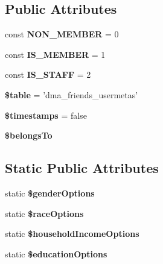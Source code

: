 \subsection*{Public Attributes}
\begin{DoxyCompactItemize}
\item 
\hypertarget{classDMA_1_1Friends_1_1Models_1_1Usermeta_a3e0526daabd8785649e0755dbdf4ebae}{const {\bfseries N\+O\+N\+\_\+\+M\+E\+M\+B\+E\+R} = 0}\label{classDMA_1_1Friends_1_1Models_1_1Usermeta_a3e0526daabd8785649e0755dbdf4ebae}

\item 
\hypertarget{classDMA_1_1Friends_1_1Models_1_1Usermeta_aa5a492cddba999d3798f2d0c2340fad5}{const {\bfseries I\+S\+\_\+\+M\+E\+M\+B\+E\+R} = 1}\label{classDMA_1_1Friends_1_1Models_1_1Usermeta_aa5a492cddba999d3798f2d0c2340fad5}

\item 
\hypertarget{classDMA_1_1Friends_1_1Models_1_1Usermeta_a73c2b62b4d8e31f04c362931cf4fad77}{const {\bfseries I\+S\+\_\+\+S\+T\+A\+F\+F} = 2}\label{classDMA_1_1Friends_1_1Models_1_1Usermeta_a73c2b62b4d8e31f04c362931cf4fad77}

\item 
\hypertarget{classDMA_1_1Friends_1_1Models_1_1Usermeta_a7ca76640d4cd53c875648ec87d085f1d}{{\bfseries \$table} = 'dma\+\_\+friends\+\_\+usermetas'}\label{classDMA_1_1Friends_1_1Models_1_1Usermeta_a7ca76640d4cd53c875648ec87d085f1d}

\item 
\hypertarget{classDMA_1_1Friends_1_1Models_1_1Usermeta_ae1136713ee0c7d6696930ebe2401f19c}{{\bfseries \$timestamps} = false}\label{classDMA_1_1Friends_1_1Models_1_1Usermeta_ae1136713ee0c7d6696930ebe2401f19c}

\item 
{\bfseries \$belongs\+To}
\end{DoxyCompactItemize}
\subsection*{Static Public Attributes}
\begin{DoxyCompactItemize}
\item 
static {\bfseries \$gender\+Options}
\item 
static {\bfseries \$race\+Options}
\item 
static {\bfseries \$household\+Income\+Options}
\item 
static {\bfseries \$education\+Options}
\end{DoxyCompactItemize}
